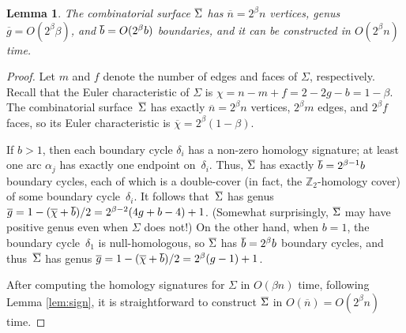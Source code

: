 \documentclass[11pt,twoside]{article}
\def\Z{\mathbb{Z}}
\def\dualarc{\alpha}
\def\Sigmabar{\overline{\smash{\Sigma}\vphantom{t}}}
\def\bbar{\overline{\smash{b}\vphantom{t}}}
\def\nbar{\overline{n}}
\def\gbar{\overline{g}}
\def\chibar{\overline{\chi}}
\newtheorem{lemma}[theorem]{Lemma}
\begin{document}
\begin{lemma}
\label{lem:cover-cxy}
The combinatorial surface $\Sigmabar$ has $\nbar = 2^\beta n$ vertices, genus $\gbar = O(2^\beta \beta)$, and $\bbar = O(2^\beta b)$ boundaries, and it can be constructed in $O(2^\beta n)$ time.
\end{lemma}

\begin{proof}
Let $m$ and $f$ denote the number of edges and faces of $\Sigma$, respectively.  Recall that the Euler characteristic of $\Sigma$ is $\chi = n - m + f = 2 - 2g - b = 1-\beta$.  The combinatorial surface~$\Sigmabar$ has exactly $\nbar = 2^\beta n$ vertices, $2^\beta m$ edges, and $2^\beta f$ faces, so its Euler characteristic is $\chibar = 2^\beta (1-\beta)$.

If $b>1$, then each boundary cycle $\delta_i$ has a non-zero homology signature; at least one arc $\dualarc_j$ has exactly one endpoint on~$\delta_i$.  Thus, $\Sigmabar$ has exactly $\bbar = 2^{\beta-1} b$ boundary cycles, each of which is a double-cover (in fact, the $\Z_2$-homology cover) of some boundary cycle~$\delta_i$.  It follows that~$\Sigmabar$ has genus $\gbar = 1-(\chibar+\bbar)/2 = {2^{\beta-2} ({4g+b-4}) + 1}$.  (Somewhat surprisingly, $\Sigmabar$ may have positive genus even when $\Sigma$ does not!)  On the other hand, when $b=1$, the boundary cycle~$\delta_1$ is null-homologous, so $\Sigmabar$ has $\bbar = 2^\beta b$ boundary cycles, and thus~$\Sigmabar$ has genus $\gbar = {1-(\chibar+\bbar)/2} =  {2^\beta (g-1) + 1}$.

After computing the homology signatures for $\Sigma$ in $O(\beta n)$ time, following Lemma \ref{lem:sign}, it is straightforward to construct $\Sigmabar$ in $O(\nbar) = O(2^\beta n)$ time.
\end{proof}
\end{document}
